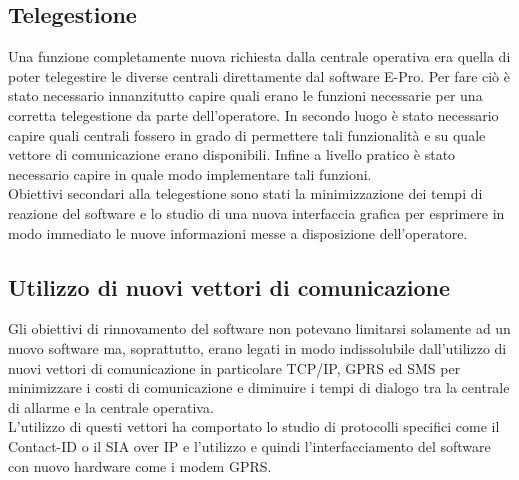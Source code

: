 \subsection{Telegestione}
Una funzione completamente nuova richiesta dalla centrale operativa era quella di poter telegestire le diverse centrali direttamente dal software E-Pro. Per fare ciò è stato necessario innanzitutto capire quali erano le funzioni necessarie per una corretta telegestione da parte dell'operatore. In secondo luogo è stato necessario capire quali centrali fossero in grado di permettere tali funzionalità e su quale vettore di comunicazione erano disponibili. Infine a livello pratico è stato necessario capire in quale modo implementare tali funzioni.\\
Obiettivi secondari alla telegestione sono stati la minimizzazione dei tempi di reazione del software e lo studio di una nuova interfaccia grafica per esprimere in modo immediato le nuove informazioni messe a disposizione dell'operatore.
\subsection{Utilizzo di nuovi vettori di comunicazione}
Gli obiettivi di rinnovamento del software non potevano limitarsi solamente ad un nuovo software ma, soprattutto, erano legati in modo indissolubile dall'utilizzo di nuovi vettori di comunicazione in particolare TCP/IP, GPRS ed SMS per minimizzare i costi di comunicazione e diminuire i tempi di dialogo tra la centrale di allarme e la centrale operativa.\\
L'utilizzo di questi vettori ha comportato lo studio di protocolli specifici come il Contact-ID o il SIA over IP e l'utilizzo e quindi l'interfacciamento del software con nuovo hardware come i modem GPRS.
